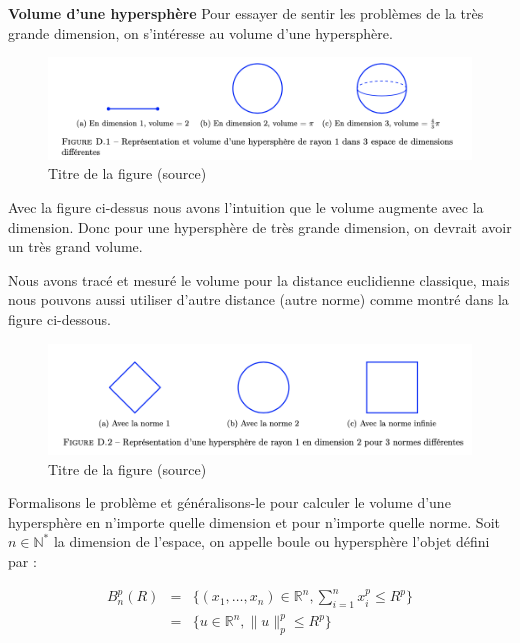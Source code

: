\textbf{Volume d’une hypersphère}
Pour essayer de sentir les problèmes de la très grande dimension, on s’intéresse au volume d’une hypersphère.


\begin{figure}[h!]
	\begin{center}
		\caption{Titre de la figure (source)}
		\includegraphics[width=\linewidth]{./img/notions_math/hypersphere_1}
	\end{center}
\end{figure}

Avec la figure ci-dessus nous avons l’intuition que le volume augmente avec la dimension. Donc pour une hypersphère de très grande dimension, on devrait avoir un très grand volume.

Nous avons tracé et mesuré le volume pour la distance euclidienne classique, mais nous pouvons aussi utiliser d’autre distance (autre norme) comme montré dans la figure ci-dessous.


\begin{figure}[h!]
	\begin{center}
		\caption{Titre de la figure (source)}
		\includegraphics[width=\linewidth]{./img/notions_math/hypersphere_2}
	\end{center}
\end{figure}


Formalisons le problème et généralisons-le pour calculer le volume d’une hypersphère en n’importe quelle dimension et pour n’importe quelle norme. Soit $n \in \mathbb{N}^*$ la dimension de l’espace, on appelle boule ou hypersphère l’objet défini par :

\begin{eqnarray*} 
    B_n^p(R) &=& \{ (x_1, \ldots, x_n) \in \mathbb{R}^n, \sum_{i=1}^n x_i^p \leqslant R^p\} \\
    &=& \{ u \in \mathbb{R}^n, \|u\|_p^p \leqslant R^p\}
\end{eqnarray*}

